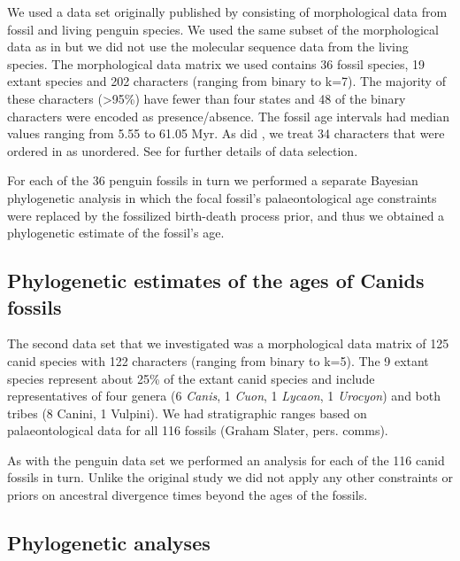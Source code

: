 \documentclass[11pt]{article}
\newcommand{\ncanidfossils}{{116}}
\begin{document}
We used a data set originally published by \cite{ksepka2012} consisting of morphological data from fossil and living penguin 
species. 
We used the same subset of the morphological data as in \cite{gavryushkina2015bayesian} but we did not use the molecular sequence data from the living species. 
The morphological data matrix we used contains 36 fossil species, 19 extant species and 202 characters (ranging from binary to k=7). 
The majority of these characters (\textgreater 95\%) have fewer than four states and 48 of the binary characters were encoded as presence/absence. 
The fossil age intervals had median values ranging from 5.55 to 61.05 Myr.
As did \cite{gavryushkina2015bayesian}, we treat 34 characters that were ordered in \cite{ksepka2012} as unordered. 
See \cite{gavryushkina2015bayesian} for further details of data selection.

For each of the 36 penguin fossils in turn we performed a separate Bayesian phylogenetic analysis in which the focal fossil's palaeontological age constraints were replaced by 
the fossilized birth-death process prior, and thus we obtained a phylogenetic estimate of the fossil's age.  

\subsection*{Phylogenetic estimates of the ages of Canids fossils}

The second data set that we investigated was a morphological data matrix of 125 canid species \cite[9 extant and \ncanidfossils{} fossil;][]{Slater2015} with 122 characters (ranging from binary to k=5).
The 9 extant species represent about 25\% of the extant canid species and include representatives of four genera (6 {\em Canis}, 1 {\em Cuon}, 1 {\em Lycaon}, 1 {\em Urocyon}) and both tribes (8 Canini, 1 Vulpini). 
We had stratigraphic ranges based on palaeontological data for all \ncanidfossils{} fossils (Graham Slater, pers. comms). 

As with the penguin data set we  performed an analysis for each of the \ncanidfossils{} canid fossils in turn. 
 Unlike the original study \cite{Slater2015} we did not apply any other constraints or priors on ancestral divergence times beyond the ages of the fossils. 

\subsection*{Phylogenetic analyses}
\end{document}
